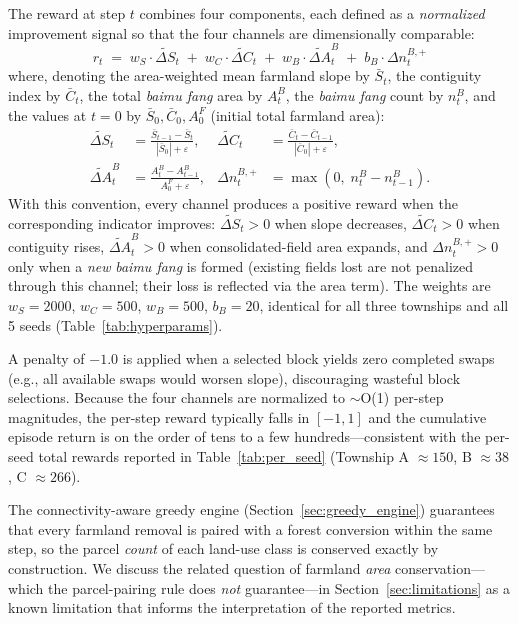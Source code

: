\documentclass[preprint,12pt]{elsarticle}
\begin{document}
The reward at step $t$ combines four components, each defined as a \textit{normalized} improvement signal so that the four channels are dimensionally comparable:
\begin{equation}
r_t \;=\; w_S \cdot \widetilde{\Delta S}_t \;+\; w_C \cdot \widetilde{\Delta C}_t \;+\; w_B \cdot \widetilde{\Delta A}^{B}_t \;+\; b_B \cdot \Delta n^{B,+}_t
\label{eq:reward}
\end{equation}
where, denoting the area-weighted mean farmland slope by $\bar{S}_t$, the contiguity index by $\bar{C}_t$, the total \textit{baimu fang} area by $A^{B}_t$, the \textit{baimu fang} count by $n^{B}_t$, and the values at $t{=}0$ by $\bar{S}_0,\bar{C}_0,A^{F}_0$ (initial total farmland area):
\begin{align}
\widetilde{\Delta S}_t &= \frac{\bar{S}_{t-1} - \bar{S}_t}{|\bar{S}_0| + \varepsilon}, &
\widetilde{\Delta C}_t &= \frac{\bar{C}_t - \bar{C}_{t-1}}{|\bar{C}_0| + \varepsilon}, \\
\widetilde{\Delta A}^{B}_t &= \frac{A^{B}_t - A^{B}_{t-1}}{A^{F}_0 + \varepsilon}, &
\Delta n^{B,+}_t &= \max\!\left(0,\; n^{B}_t - n^{B}_{t-1}\right).
\end{align}
With this convention, every channel produces a positive reward when the corresponding indicator improves: $\widetilde{\Delta S}_t > 0$ when slope decreases, $\widetilde{\Delta C}_t > 0$ when contiguity rises, $\widetilde{\Delta A}^{B}_t > 0$ when consolidated-field area expands, and $\Delta n^{B,+}_t > 0$ only when a \textit{new} \textit{baimu fang} is formed (existing fields lost are not penalized through this channel; their loss is reflected via the area term). The weights are $w_S = 2000$, $w_C = 500$, $w_B = 500$, $b_B = 20$, identical for all three townships and all 5 seeds (Table~\ref{tab:hyperparams}).

A penalty of $-1.0$ is applied when a selected block yields zero completed swaps (e.g., all available swaps would worsen slope), discouraging wasteful block selections. Because the four channels are normalized to $\sim$O(1) per-step magnitudes, the per-step reward typically falls in $[-1, 1]$ and the cumulative episode return is on the order of tens to a few hundreds---consistent with the per-seed total rewards reported in Table~\ref{tab:per_seed} (Township A $\approx 150$, B $\approx 38$, C $\approx 266$).

The connectivity-aware greedy engine (Section~\ref{sec:greedy_engine}) guarantees that every farmland removal is paired with a forest conversion within the same step, so the parcel \textit{count} of each land-use class is conserved exactly by construction. We discuss the related question of farmland \textit{area} conservation---which the parcel-pairing rule does \textit{not} guarantee---in Section~\ref{sec:limitations} as a known limitation that informs the interpretation of the reported metrics.
\end{document}
